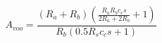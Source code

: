 \begin{equation}
A_{v oo} = \frac{\left(R_{a} + R_{b}\right) \left(\frac{R_{a} R_{b} c_{c} s}{2 R_{a} + 2 R_{b}} + 1\right)}{R_{b} \left(0.5 R_{s} c_{c} s + 1\right)}
\end{equation}

